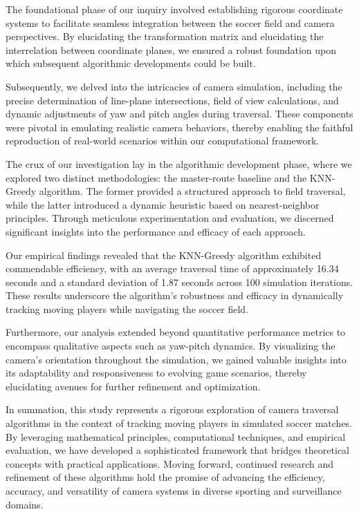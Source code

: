 The foundational phase of our inquiry involved establishing rigorous coordinate systems to facilitate seamless integration between the soccer field and camera perspectives. By elucidating the transformation matrix and elucidating the interrelation between coordinate planes, we ensured a robust foundation upon which subsequent algorithmic developments could be built.

Subsequently, we delved into the intricacies of camera simulation, including the precise determination of line-plane intersections, field of view calculations, and dynamic adjustments of yaw and pitch angles during traversal. These components were pivotal in emulating realistic camera behaviors, thereby enabling the faithful reproduction of real-world scenarios within our computational framework.

The crux of our investigation lay in the algorithmic development phase, where we explored two distinct methodologies: the master-route baseline and the KNN-Greedy algorithm. The former provided a structured approach to field traversal, while the latter introduced a dynamic heuristic based on nearest-neighbor principles. Through meticulous experimentation and evaluation, we discerned significant insights into the performance and efficacy of each approach.

Our empirical findings revealed that the KNN-Greedy algorithm exhibited commendable efficiency, with an average traversal time of approximately 16.34 seconds and a standard deviation of 1.87 seconds across 100 simulation iterations. These results underscore the algorithm's robustness and efficacy in dynamically tracking moving players while navigating the soccer field.

Furthermore, our analysis extended beyond quantitative performance metrics to encompass qualitative aspects such as yaw-pitch dynamics. By visualizing the camera's orientation throughout the simulation, we gained valuable insights into its adaptability and responsiveness to evolving game scenarios, thereby elucidating avenues for further refinement and optimization.

In summation, this study represents a rigorous exploration of camera traversal algorithms in the context of tracking moving players in simulated soccer matches. By leveraging mathematical principles, computational techniques, and empirical evaluation, we have developed a sophisticated framework that bridges theoretical concepts with practical applications. Moving forward, continued research and refinement of these algorithms hold the promise of advancing the efficiency, accuracy, and versatility of camera systems in diverse sporting and surveillance domains.